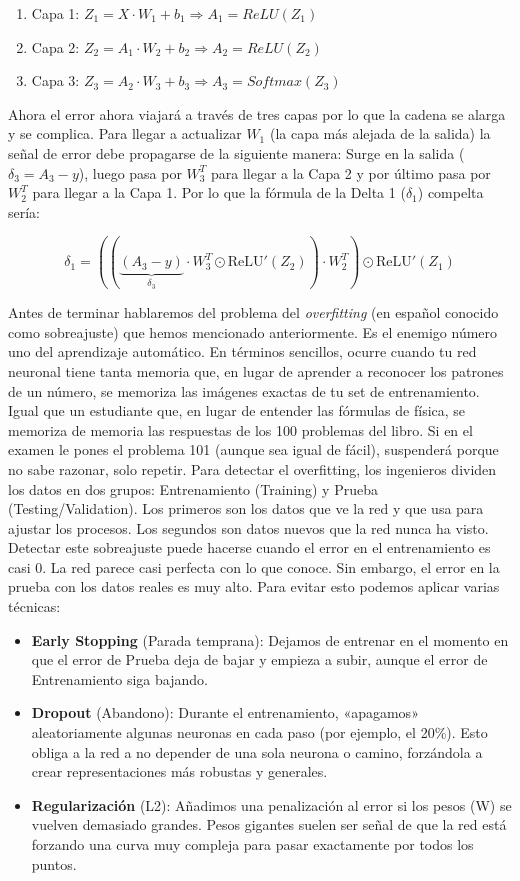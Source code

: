 \documentclass[a4paper,11pt]{article}
\begin{document}
\begin{enumerate}
\def\labelenumi{\arabic{enumi}.}
\item
  Capa 1: \(Z_1=X \cdot W_1+b_1 \Rightarrow A_1=ReLU(Z_1)\)
\item
  Capa 2: \(Z_2=A_1\cdot W_2+b_2 \Rightarrow A_2=ReLU(Z_2)\)
\item
  Capa 3: \(Z_3=A_ 2\cdot W_3+b_3 \Rightarrow A_3=Softmax(Z_3)\)
\end{enumerate}

Ahora el error ahora viajará a través de tres capas por lo que la cadena
se alarga y se complica. Para llegar a actualizar \(W_1\) (la capa más
alejada de la salida) la señal de error debe propagarse de la siguiente
manera: Surge en la salida (\(\delta_3 = A_3 - y\)), luego pasa por
\(W_3^T\) para llegar a la Capa 2 y por último pasa por \(W_2^T\) para
llegar a la Capa 1. Por lo que la fórmula de la Delta 1 (\(\delta_1\))
compelta sería:

\[
\delta_1 = ((\underbrace{(A_3 - y)}_{\delta_3} \cdot W_3^T \odot \text{ReLU}'(Z_2)) \cdot W_2^T) \odot \text{ReLU}'(Z_1)
\]

Antes de terminar hablaremos del problema del \emph{overfitting} (en
español conocido como sobreajuste) que hemos mencionado anteriormente.
Es el enemigo número uno del aprendizaje automático. En términos
sencillos, ocurre cuando tu red neuronal tiene tanta memoria que, en
lugar de aprender a reconocer los patrones de un número, se memoriza las
imágenes exactas de tu set de entrenamiento. Igual que un estudiante
que, en lugar de entender las fórmulas de física, se memoriza de memoria
las respuestas de los 100 problemas del libro. Si en el examen le pones
el problema 101 (aunque sea igual de fácil), suspenderá porque no sabe
razonar, solo repetir. Para detectar el overfitting, los ingenieros
dividen los datos en dos grupos: Entrenamiento (Training) y Prueba
(Testing/Validation). Los primeros son los datos que ve la red y que usa
para ajustar los procesos. Los segundos son datos nuevos que la red
nunca ha visto. Detectar este sobreajuste puede hacerse cuando el error
en el entrenamiento es casi 0. La red parece casi perfecta con lo que
conoce. Sin embargo, el error en la prueba con los datos reales es muy
alto. Para evitar esto podemos aplicar varias técnicas:

\begin{itemize}
\item
  \textbf{Early Stopping} (Parada temprana): Dejamos de entrenar en el
  momento en que el error de Prueba deja de bajar y empieza a subir,
  aunque el error de Entrenamiento siga bajando.
\item
  \textbf{Dropout} (Abandono): Durante el entrenamiento, «apagamos»
  aleatoriamente algunas neuronas en cada paso (por ejemplo, el 20\%).
  Esto obliga a la red a no depender de una sola neurona o camino,
  forzándola a crear representaciones más robustas y generales.
\item
  \textbf{Regularización} (L2): Añadimos una penalización al error si
  los pesos (W) se vuelven demasiado grandes. Pesos gigantes suelen ser
  señal de que la red está forzando una curva muy compleja para pasar
  exactamente por todos los puntos.
\end{itemize}
\end{document}

